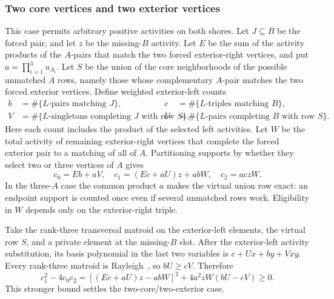 \documentclass[11pt,a4paper]{article}
\theoremstyle{remark}\newtheorem{remark}[theorem]{Remark}
\begin{document}
\subsubsection{Two core vertices and two exterior vertices}
This case permits arbitrary positive activities on both shores. Let $J\subseteq B$ be the forced pair, and let $z$ be the missing-$B$ activity. Let $E$ be the sum of the activity products of the $A$-pairs that match the two forced exterior-right vertices, and put $a=\prod_{i=1}^3u_{A_i}$. Let $S$ be the union of the core neighborhoods of the possible unmatched $A$ rows, namely those whose complementary $A$-pair matches the two forced exterior vertices. Define weighted exterior-left counts
\begin{align*}
 b&=\#\{L\text{-pairs matching }J\},&
 c&=\#\{L\text{-triples matching }B\},\\
 V&=\#\{L\text{-singletons completing }J\text{ with row }S\},&
 U&=\#\{L\text{-pairs completing }B\text{ with row }S\}.
\end{align*}
Here each count includes the product of the selected left activities. Let $W$ be the total activity of remaining exterior-right vertices that complete the forced exterior pair to a matching of all of $A$. Partitioning supports by whether they select two or three vertices of $A$ gives
\[
 c_0=Eb+aV,\quad
 c_1=(Ec+aU)z+abW,\quad
 c_2=ac zW.
\]
In the three-$A$ case the common product $a$ makes the virtual union row exact: an endpoint support is counted once even if several unmatched rows work. Eligibility in $W$ depends only on the exterior-right triple.

Take the rank-three transversal matroid on the exterior-left elements, the virtual row $S$, and a private element at the missing-$B$ slot. After the exterior-left activity substitution, its basis polynomial in the last two variables is $c+Ux+by+Vxy$. Every rank-three matroid is Rayleigh~\cite[Theorem 1.1]{b:Wagner}, so $bU\ge cV$. Therefore
\begin{equation}\label{mrn:s:ne:eq:rayleighsector}
 c_1^2-4c_0c_2=[(Ec+aU)z-abW]^2+4a^2zW(bU-cV)\ge0.
\end{equation}
This stronger bound settles the two-core/two-exterior case.
\end{document}
